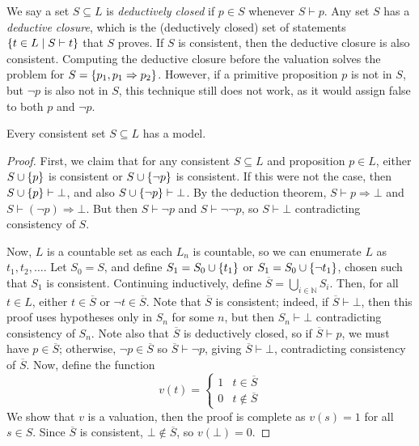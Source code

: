 We say a set \( S \subseteq L \) is \emph{deductively closed} if \( p \in S \) whenever \( S \vdash p \).
Any set \( S \) has a \emph{deductive closure}, which is the (deductively closed) set of statements \( \qty{t \in L \mid S \vdash t} \) that \( S \) proves.
If \( S \) is consistent, then the deductive closure is also consistent.
Computing the deductive closure before the valuation solves the problem for \( S = \qty{p_1, p_1 \Rightarrow p_2} \).
However, if a primitive proposition \( p \) is not in \( S \), but \( \neg p \) is also not in \( S \), this technique still does not work, as it would assign false to both \( p \) and \( \neg p \).
\begin{theorem}
    Every consistent set \( S \subseteq L \) has a model.
\end{theorem}
\begin{proof}
    First, we claim that for any consistent \( S \subseteq L \) and proposition \( p \in L \), either \( S \cup \qty{p} \) is consistent or \( S \cup \qty{\neg p} \) is consistent.
    If this were not the case, then \( S \cup \qty{p} \vdash \bot \), and also \( S \cup \qty{\neg p} \vdash \bot \).
    By the deduction theorem, \( S \vdash p \Rightarrow \bot \) and \( S \vdash (\neg p) \Rightarrow \bot \).
    But then \( S \vdash \neg p \) and \( S \vdash \neg\neg p \), so \( S \vdash \bot \) contradicting consistency of \( S \).

    Now, \( L \) is a countable set as each \( L_n \) is countable, so we can enumerate \( L \) as \( t_1, t_2, \dots \).
    Let \( S_0 = S \), and define \( S_1 = S_0 \cup \qty{t_1} \) or \( S_1 = S_0 \cup \qty{\neg t_1} \), chosen such that \( S_1 \) is consistent.
    Continuing inductively, define \( \overline S = \bigcup_{i \in \mathbb N} S_i \).
    Then, for all \( t \in L \), either \( t \in \overline S \) or \( \neg t \in \overline S \).
    Note that \( \overline S \) is consistent; indeed, if \( \overline S \vdash \bot \), then this proof uses hypotheses only in \( S_n \) for some \( n \), but then \( S_n \vdash \bot \) contradicting consistency of \( S_n \).
    Note also that \( \overline S \) is deductively closed, so if \( \overline S \vdash p \), we must have \( p \in \overline S \); otherwise, \( \neg p \in \overline S \) so \( \overline S \vdash \neg p \), giving \( \overline S \vdash \bot \), contradicting consistency of \( \overline S \).
    Now, define the function
    \[ v(t) = \begin{cases}
        1 & t \in \overline S \\
        0 & t \not\in \overline S
    \end{cases} \]
    We show that \( v \) is a valuation, then the proof is complete as \( v(s) = 1 \) for all \( s \in S \).
    Since \( \overline S \) is consistent, \( \bot \not\in \overline S \), so \( v(\bot) = 0 \).


\end{proof}
